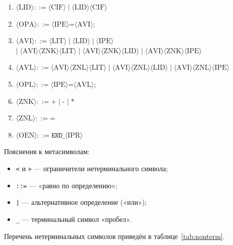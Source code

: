 \documentclass[a4paper,14pt]{extarticle}
\begin{document}
\begin{enumerate}
  \item \textit{$\langle\text{LID}\rangle ::= \langle\text{CIF}\rangle \mid \langle\text{LID}\rangle\langle\text{CIF}\rangle$}
  \item $\langle\text{OPA}\rangle ::= \langle\text{IPE}\rangle\texttt{=}\langle\text{AVI}\rangle\texttt{;}$
  \item $\langle\text{AVI}\rangle ::= \langle\text{LIT}\rangle \mid \langle\text{LID}\rangle \mid \langle\text{IPE}\rangle$\\
        $\mid\; \langle\text{AVI}\rangle\langle\text{ZNK}\rangle\langle\text{LIT}\rangle
        \mid \langle\text{AVI}\rangle\langle\text{ZNK}\rangle\langle\text{LID}\rangle
        \mid \langle\text{AVI}\rangle\langle\text{ZNK}\rangle\langle\text{IPE}\rangle$
  \item $\langle\text{AVL}\rangle ::= \langle\text{AVI}\rangle\langle\text{ZNL}\rangle\langle\text{LIT}\rangle
        \mid \langle\text{AVI}\rangle\langle\text{ZNL}\rangle\langle\text{LID}\rangle
        \mid \langle\text{AVI}\rangle\langle\text{ZNL}\rangle\langle\text{IPE}\rangle$
  \item $\langle\text{OPL}\rangle ::= \langle\text{IPE}\rangle\texttt{=}\langle\text{AVL}\rangle\texttt{;}$
  \item $\langle\text{ZNK}\rangle ::= \texttt{+} \mid \texttt{-}$ \textit{$\mid\; \texttt{*}$}
  \item \textit{$\langle\text{ZNL}\rangle ::= \texttt{=}$}
  \item $\langle\text{OEN}\rangle ::= \texttt{END\_}\langle\text{IPR}\rangle$
\end{enumerate}

Пояснения к метасимволам:
\begin{itemize}
  \item \texttt{<} и \texttt{>} — ограничители нетерминального символа;
  \item \texttt{::=} — «равно по определению»;
  \item \texttt{|} — альтернативное определение («или»);
  \item \texttt{\_} — терминальный символ «пробел».
\end{itemize}

Перечень нетерминальных символов приведён в таблице~\ref{tab:nonterm}.
\end{document}
